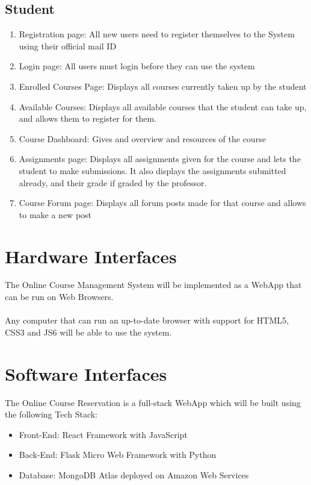 \documentclass[12pt, a4]{report}
\begin{document}
\subsection{Student}
\begin{enumerate}
    \item Registration page: All new users need to register themselves to the System using their official mail ID
    \item Login page: All users must login before they can use the system
    \item Enrolled Courses Page: Displays all courses currently taken up by the student
    \item Available Courses: Displays all available courses that the student can take up, and allows them to register for them.
    \item Course Dashboard: Gives and overview and resources of the course
    \item Assignments page: Displays all assignments given for the course and lets the student to make submissions. It also displays the assignments submitted already, and their grade if graded by the professor.
    \item Course Forum page: Displays all forum posts made for that course and allows to make a new post
\end{enumerate}

\section{Hardware Interfaces}
The Online Course Management System will be implemented as a WebApp that can be run on Web Browsers.
\\\\
Any computer that can run an up-to-date browser with support for HTML5, CSS3 and JS6 will be able to use the system.

\section{Software Interfaces}
The Online Course Reservation is a full-stack WebApp which will be built using the following Tech Stack:
\begin{itemize}
    \item Front-End: React Framework with JavaScript
    \item Back-End: Flask Micro Web Framework with Python
    \item Database: MongoDB Atlas deployed on Amazon Web Services
\end{itemize}
\end{document}
